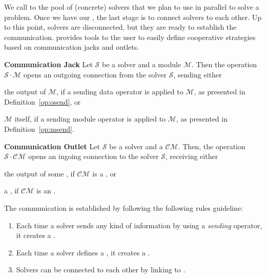 We call \INTROsoset{} to the pool of (concrete) solvers that we plan to use in parallel to solve a problem. Once we have our \soset, the last stage is to connect solvers to each other. Up to this point, solvers are disconnected, but they are ready to establish the communication. \posl{} provides tools  to the user to easily define cooperative strategies based on communication jacks and outlets.


\begin{definition}\label{def:comm_jack}
{\bf Communication Jack} Let $\mathcal{S}$ be a solver and a module $\mathcal{M}$. Then the operation $\mathcal{S}\cdot\mathcal{M}$ opens an outgoing connection from the solver $\mathcal{S}$, sending either 
\begin{inparaenum}[a)]
	\item the output of $\mathcal{M}$, if a sending data operator is applied to $\mathcal{M}$, as presented in Definition~\ref{op:osend}, or
	\item $\mathcal{M}$ itself, if a sending module operator is applied to $\mathcal{M}$, as presented in Definition~\ref{op:msend}.
\end{inparaenum}
\end{definition} 

\begin{definition}\label{def:comm_outlet}
{\bf Communication Outlet} Let $\mathcal{S}$ be a solver and a \opch{} $\mathcal{CM}$. Then, the operation $\mathcal{S}\cdot\mathcal{CM}$ opens an ingoing connection to the solver $\mathcal{S}$, receiving either 
\begin{inparaenum}[a)]
	\item the output of some \om{}, if $\mathcal{CM}$ is a \dopch{}, or
	\item a \om{}, if $\mathcal{CM}$ is an \oopch.
\end{inparaenum}
\end{definition} 


The communication is established by following the following rules guideline:
\begin{enumerate}%
	\item Each time a solver sends any kind of information by using a {\it sending} operator, it creates a \INTROjack.
	\item Each time a solver defines a \opch, it creates a \INTROoutlet. 
	\item Solvers can be connected to each other by linking \jacks{} to \outlets.
\end{enumerate} %

